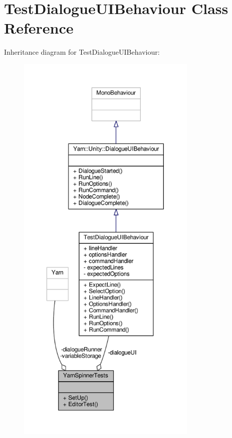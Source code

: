 \hypertarget{a00147}{\section{Test\-Dialogue\-U\-I\-Behaviour Class Reference}
\label{a00147}
}


Inheritance diagram for Test\-Dialogue\-U\-I\-Behaviour\-:
\nopagebreak
\begin{figure}[H]
\begin{center}
\leavevmode
\includegraphics[width=244pt]{d2/d45/a00342}
\end{center}
\end{figure}


